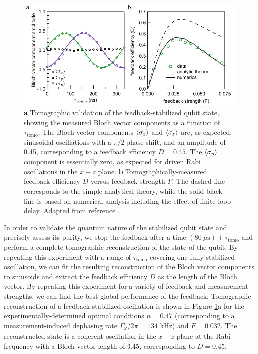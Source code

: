 \begin{figure}
\begin{center}
	\includegraphics[width = 5.5in]{qfb_results_chapter/fb_tomo}
\end{center}
\caption[Tomographic validation of feedback]{\textbf{a} Tomographic validation of the feedback-stabilized qubit state, showing the measured Bloch vector components as a function of $\tau_\mathrm{tomo}$.  The Bloch vector components $\langle\sigma_x\rangle$ and $\langle\sigma_z\rangle$ are, as expected, sinusoidal oscillations with a $\pi/2$ phase shift, and an amplitude of 0.45, corresponding to a feedback efficiency $D = 0.45$.  The $\langle\sigma_y\rangle$ component is essentially zero, as expected for driven Rabi oscillations in the $x-z$ plane.  \textbf{b} Tomographically-measured feedback efficiency $D$  versus feedback strength $F$.  The dashed line corresponds to the simple analytical theory, while the solid black line is based on numerical analysis including the effect of finite loop delay.  Adapted from reference \cite{vijay_stabilizing_2012}.}
\label{fig:fb_tomo}
\end{figure}

In order to validate the quantum nature of the stabilized qubit state and precisely assess its purity, we stop the feedback after a time $(80 \ \mu\mathrm{s}) + \tau_\mathrm{tomo}$ and perform a complete tomographic reconstruction of the state of the qubit.  By repeating this experiment with a range of $\tau_\mathrm{tomo}$ covering one fully stabilized oscillation, we can fit the resulting reconstruction of the Bloch vector components to sinusoids and extract the feedback efficiency $D$ as the length of the Bloch vector.  By repeating this experiment for a variety of feedback and measurement strengths, we can find the best global performance of the feedback.  Tomographic reconstruction of a feedback-stabilized oscillation is shown in Figure \ref{fig:fb_tomo}a for the experimentally-determined optimal conditions $\bar{n} = 0.47$ (corresponding to a measurement-induced dephasing rate $\Gamma_\varphi/2\pi = 134$ kHz) and $F = 0.032$.  The reconstructed state is a coherent oscillation in the $x-z$ plane at the Rabi frequency with a Bloch vector length of 0.45, corresponding to $D = 0.45$.

